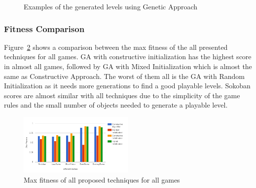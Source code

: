\documentclass[letterpaper]{article}
\newcommand{\figref}[1]{Figure~\ref{Figure:#1}}
\begin{document}
\begin{figure}[ht]
  	\centering
    \caption{Examples of the generated levels using Genetic Approach}
    \label{Figure:geneticExamples}
\end{figure}

\subsubsection{Fitness Comparison}
\figref{maxFitnessComparison} shows a comparison between the max fitness of the all presented techniques for all games. GA with constructive initialization has the highest score in almost all games, followed by GA with Mixed Initialization which is almost the same as Constructive Approach. The worst of them all is the GA with Random Initialization as it needs more generations to find a good playable levels. Sokoban scores are almost similar with all techniques due to the simplicity of the game rules and the small number of objects needed to generate a playable level.

\begin{figure}[ht]
  	\centering
    \includegraphics[width=0.5\textwidth]{Images/Level_MaxFitness_Comparison}
    \caption{Max fitness of all proposed techniques for all games}
    \label{Figure:maxFitnessComparison}
\end{figure}
\end{document}
